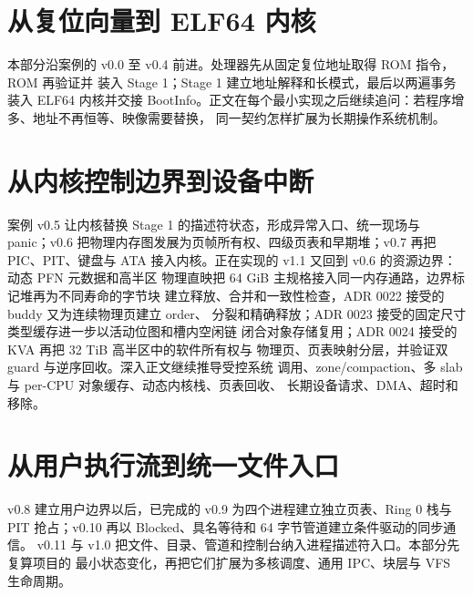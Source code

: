 \documentclass[UTF8,openany,zihao=5,fontset=none]{ctexbook}
\begin{document}
\frontmatter





\tableofcontents

\let\bookcleardoublepage\cleardoublepage
\let\cleardoublepage\clearpage
\mainmatter
\let\cleardoublepage\bookcleardoublepage

\part{从复位向量到 ELF64 内核}
\begin{partbridge}
本部分沿案例的 v0.0 至 v0.4 前进。处理器先从固定复位地址取得 ROM 指令，ROM 再验证并
装入 Stage 1；Stage 1 建立地址解释和长模式，最后以两遍事务装入 ELF64 内核并交接
BootInfo。正文在每个最小实现之后继续追问：若程序增多、地址不再恒等、映像需要替换，
同一契约怎样扩展为长期操作系统机制。
\end{partbridge}




\part{从内核控制边界到设备中断}
\begin{partbridge}
案例 v0.5 让内核替换 Stage 1 的描述符状态，形成异常入口、统一现场与 panic；v0.6
把物理内存图发展为页帧所有权、四级页表和早期堆；v0.7 再把 PIC、PIT、键盘与 ATA
接入内核。正在实现的 v1.1 又回到 v0.6 的资源边界：动态 PFN 元数据和高半区
物理直映把 64 GiB 主规格接入同一内存通路，边界标记堆再为不同寿命的字节块
建立释放、合并和一致性检查，ADR 0022 接受的 buddy 又为连续物理页建立 order、
分裂和精确释放；ADR 0023 接受的固定尺寸类型缓存进一步以活动位图和槽内空闲链
闭合对象存储复用；ADR 0024 接受的 KVA 再把 32 TiB 高半区中的软件所有权与
物理页、页表映射分层，并验证双 guard 与逆序回收。深入正文继续推导受控系统
调用、zone/compaction、多 slab 与 per-CPU 对象缓存、动态内核栈、页表回收、
长期设备请求、DMA、超时和移除。
\end{partbridge}




\part{从用户执行流到统一文件入口}
\begin{partbridge}
v0.8 建立用户边界以后，已完成的 v0.9 为四个进程建立独立页表、Ring 0 栈与
PIT 抢占；v0.10 再以 Blocked、具名等待和 64 字节管道建立条件驱动的同步通信。
v0.11 与 v1.0 把文件、目录、管道和控制台纳入进程描述符入口。本部分先复算项目的
最小状态变化，再把它们扩展为多核调度、通用 IPC、块层与 VFS 生命周期。
\end{partbridge}



\end{document}
